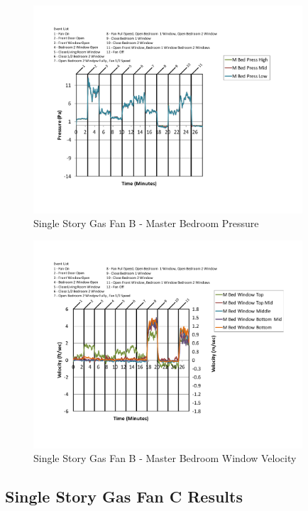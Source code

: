 \documentclass{article}
\begin{document}
\begin{appendices}
	\begin{figure}[H]
		\centering
		\includegraphics[height=3.05in,trim=0.67in 1.1in 0.67in 0.8in,clip=true]{0_Images/Results_Charts/ColdFlow/Single_Story/Gas/B/Master_Bedroom_Pressure.pdf}
		\caption{Single Story Gas Fan B - Master Bedroom Pressure}
	\end{figure}
 

	\begin{figure}[H]
		\centering
		\includegraphics[height=3.05in,trim=0.67in 1.1in 0.67in 0.8in,clip=true]{0_Images/Results_Charts/ColdFlow/Single_Story/Gas/B/Master_Bedroom_Window_Velocity.pdf}
		\caption{Single Story Gas Fan B - Master Bedroom Window Velocity}
	\end{figure}
 
	\clearpage

		\clearpage
\clearpage		\large
\subsection{Single Story Gas Fan C Results} \label{App:Single_StoryGasFanCResults} 


\end{appendices}
\end{document}
